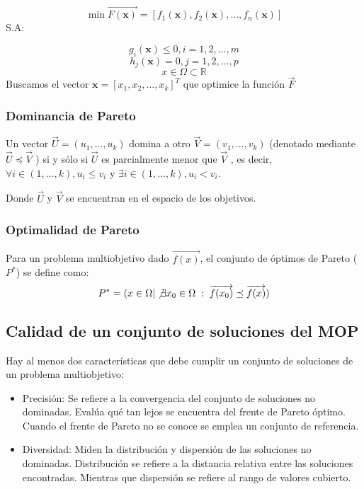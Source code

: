 \documentclass[letterpaper,10pt]{article}
\begin{document}
$$\min \overrightarrow{F(\bm{x})} = \left[ f_1(\bm{x}), f_2(\bm{x}) , \dots, f_n(\bm{x}) \right] $$
S.A:
 
$$g_i(\bm{x}) \leq 0, i=1,2,\dots,m$$
$$h_j(\bm{x}) = 0, j=1,2,\dots,p$$
$$x \in \Omega \subset \mathbb{R}$$
Buscamos el vector $\bm{x}=[x_1,x_2,\dots,x_k]^T$ que optimice la función $\overrightarrow{F}$

\subsubsection{Dominancia de Pareto}

Un vector $\overrightarrow{U}= (u_1 ,\dots, u_k )$ domina a otro $\overrightarrow{V}= (v_1 ,\dots, v_k )$ (denotado mediante $\overrightarrow{U} \preceq \overrightarrow{V}$ ) si y sólo si $\overrightarrow{U}$ es parcialmente menor que $\overrightarrow{V}$ , es decir,
$\forall i \in (1,\dots, k), u_i \leq v_i$ y $\exists i \in (1,\dots, k),  u_i<v_i$.

Donde $\overrightarrow{U}$ y $\overrightarrow{V}$ se encuentran en el espacio de los objetivos.
 
\subsubsection{Optimalidad de Pareto}

Para un problema multiobjetivo dado $\overrightarrow{f(x)}$, el conjunto de óptimos de Pareto ($P^*$) se define como:
$$P^* = ( x \in \Omega | \not\exists x_0 \in \Omega \; : \; \overrightarrow{f(x_0)} \preceq \overrightarrow{f(x)})$$
 
\subsection{Calidad de un conjunto de soluciones del MOP}
 
Hay al menos dos características que debe cumplir un conjunto de soluciones de un problema multiobjetivo:

\begin{itemize}
 \item Precisión: Se refiere a la convergencia del conjunto de soluciones no dominadas. Evalúa qué tan lejos se encuentra del
frente de Pareto óptimo. Cuando el frente de Pareto no se conoce se emplea un conjunto de referencia.
 \item Diversidad: Miden la distribución y dispersión de las soluciones no dominadas. Distribución se refiere a la distancia relativa entre
las soluciones encontradas. Mientras que dispersión se refiere al rango de valores cubierto.
\end{itemize}
\end{document}
